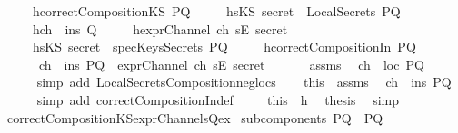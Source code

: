 \begin{isabellebody}
\ \ \ \ \ h{}{\isacharcolon}{\isachardoublequoteopen}correctCompositionKS\ PQ{\isachardoublequoteclose}\isanewline
\ \ \ \ \ h{}{\isacharcolon}{\isachardoublequoteopen}sKS\ secret\ {\isasymnotin}\ LocalSecrets\ PQ{\isachardoublequoteclose}\isanewline
\ \ \ \ \ h{}{\isacharcolon}{\isachardoublequoteopen}ch\ {\isasymin}\ ins\ Q{\isachardoublequoteclose}\isanewline
\ \ \ \ \ h{}{\isacharcolon}{\isachardoublequoteopen}exprChannel\ ch\ {\isacharparenleft}sE\ secret{\isacharparenright}{\isachardoublequoteclose}\isanewline
\ \ \ \ \ h{}{\isacharcolon}{\isachardoublequoteopen}sKS\ secret\ {\isasymnotin}\ specKeysSecrets\ PQ{\isachardoublequoteclose}\isanewline
\ \ \ \ \ h{}{\isacharcolon}{\isachardoublequoteopen}correctCompositionIn\ PQ{\isachardoublequoteclose}\isanewline
\ \ \ \ \ \ {\isachardoublequoteopen}ch\ {\isasymin}\ ins\ PQ\ {\isasymand}\ exprChannel\ ch\ {\isacharparenleft}sE\ secret{\isacharparenright}{\isachardoublequoteclose}\isanewline
%
\isadelimproof
%
\endisadelimproof
%
\isatagproof
{}\isamarkupfalse%
\ {\isacharminus}\ \isanewline
\ \ \isamarkupfalse%
\ assms\ \isamarkupfalse%
\ {\isachardoublequoteopen}ch\ {\isasymnotin}\ loc\ PQ{\isachardoublequoteclose}\ \isanewline
\ \ \ \ \isamarkupfalse%
\ {\isacharparenleft}simp\ add{\isacharcolon}\ LocalSecretsComposition{\isacharunderscore}neg{\isacharunderscore}loc{\isacharunderscore}s{\isacharparenright}\isanewline
\ \ \isamarkupfalse%
\ this\ \ assms\ \isamarkupfalse%
\ {\isachardoublequoteopen}ch\ {\isasymin}\ ins\ PQ{\isachardoublequoteclose}\ \isanewline
\ \ \ \ \isamarkupfalse%
\ {\isacharparenleft}simp\ add{\isacharcolon}\ correctCompositionIn{\isacharunderscore}def{\isacharparenright}\ \isanewline
\ \ \isamarkupfalse%
\ this\ \ h{}\ \isamarkupfalse%
\ {\isacharquery}thesis\ \isamarkupfalse%
\ simp\isanewline
{}\isamarkupfalse%
%
\endisatagproof
{\isafoldproof}%
%
\isadelimproof
\isanewline
%
\endisadelimproof
\isanewline
{}\isamarkupfalse%
\ correctCompositionKS{\isacharunderscore}exprChannel{\isacharunderscore}s{\isacharunderscore}Qex{\isacharcolon}\isanewline
{}\ {\isachardoublequoteopen}subcomponents\ PQ\ {\isacharequal}\ {\isacharbraceleft}P{\isacharcomma}Q{\isacharbraceright}{\isachardoublequoteclose}\ \isanewline

\end{isabellebody}
